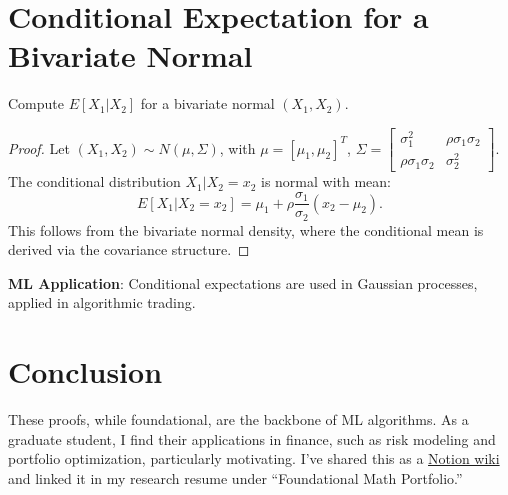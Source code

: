 \documentclass{article}
\theoremstyle{plain}
\theoremstyle{definition}
\newtheorem{proof}
\begin{document}
\section{Conditional Expectation for a Bivariate Normal}
Compute $E[X_1 | X_2]$ for a bivariate normal $(X_1, X_2)$.

\begin{proof}
Let $(X_1, X_2) \sim N(\mu, \Sigma)$, with $\mu = [\mu_1, \mu_2]^T$, $\Sigma = \begin{bmatrix} \sigma_1^2 & \rho \sigma_1 \sigma_2 \\ \rho \sigma_1 \sigma_2 & \sigma_2^2 \end{bmatrix}$. The conditional distribution $X_1 | X_2 = x_2$ is normal with mean:
\[
E[X_1 | X_2 = x_2] = \mu_1 + \rho \frac{\sigma_1}{\sigma_2} (x_2 - \mu_2).
\]
This follows from the bivariate normal density, where the conditional mean is derived via the covariance structure.
\end{proof}
\textbf{ML Application}: Conditional expectations are used in Gaussian processes, applied in algorithmic trading.

\section*{Conclusion}
These proofs, while foundational, are the backbone of ML algorithms. As a graduate student, I find their applications in finance, such as risk modeling and portfolio optimization, particularly motivating. I’ve shared this as a \href{https://notion.site/Core-ML-Math-Proofs}{Notion wiki} and linked it in my research resume under “Foundational Math Portfolio.”
\end{document}
